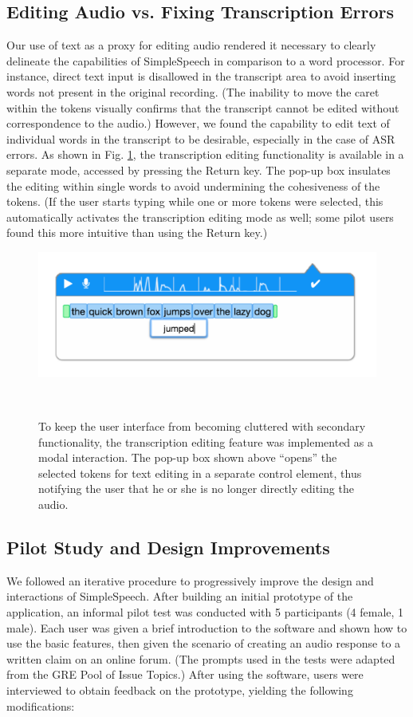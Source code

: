 \subsection{Editing Audio vs. Fixing Transcription Errors}
Our use of text as a proxy for editing audio rendered it necessary to clearly delineate the capabilities of SimpleSpeech in comparison to a word processor.
For instance, direct text input is disallowed in the transcript area to avoid inserting words not present in the original recording.
(The inability to move the caret within the tokens visually confirms that the transcript cannot be edited without correspondence to the audio.)
However, we found the capability to edit text of individual words in the transcript to be desirable, especially in the case of ASR errors.
As shown in Fig. \ref{fig:transcription}, the transcription editing functionality is available in a separate mode, accessed by pressing the Return key.
The pop-up box insulates the editing within single words to avoid undermining the cohesiveness of the tokens. 
(If the user starts typing while one or more tokens were selected, this automatically activates the transcription editing mode as well; some pilot users found this more intuitive than using the Return key.)

\begin{figure}
	\centering
	\includegraphics[width=\columnwidth,keepaspectratio]{figures/transcription_edit}
	\caption{To keep the user interface from becoming cluttered with secondary functionality, the transcription editing feature was implemented as a modal interaction. The pop-up box shown above ``opens'' the selected tokens for text editing in a separate control element, thus notifying the user that he or she is no longer directly editing the audio.}~\label{fig:transcription}
\end{figure}

\subsection{Pilot Study and Design Improvements}
We followed an iterative procedure to progressively improve the design and interactions of SimpleSpeech.
After building an initial prototype of the application, an informal pilot test was conducted with 5 participants (4 female, 1 male). 
Each user was given a brief introduction to the software and shown how to use the basic features, then given the scenario of creating an audio response to a written claim on an online forum. 
(The prompts used in the tests were adapted from the GRE Pool of Issue Topics.)
After using the software, users were interviewed to obtain feedback on the prototype, yielding the following modifications:

